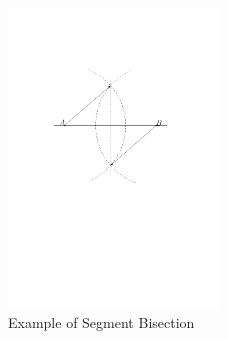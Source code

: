 \begin{figure}[H] 
	\centering
	\includegraphics[width=0.5\textwidth]{figures/bisector.pdf} 
	\caption{Example of Segment Bisection} 
	\label{fig:SegmentBisection} 
\end{figure}

\newpage
{}

\newpage
\printindex

